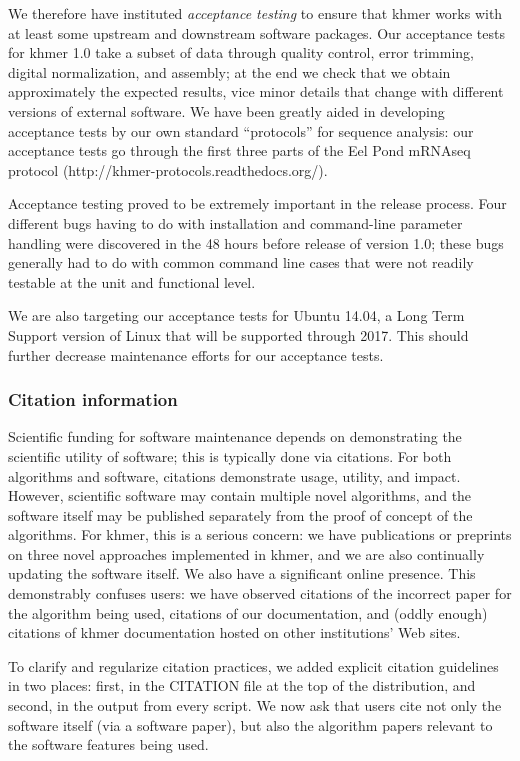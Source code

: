 \documentclass[12pt]{article}
\begin{document}
We therefore have instituted {\em acceptance testing} to ensure that
khmer works with at least some upstream and downstream software
packages.  Our acceptance tests for khmer 1.0 take a subset of data
through quality control, error trimming, digital normalization, and
assembly; at the end we check that we obtain approximately the
expected results, vice minor details that change with different
versions of external software.  We have been greatly aided in
developing acceptance tests by our own standard ``protocols'' for sequence
analysis: our acceptance tests go through the first three parts of the
Eel Pond mRNAseq protocol (http://khmer-protocols.readthedocs.org/).

Acceptance testing proved to be extremely important in the release
process.  Four different bugs having to do with installation and
command-line parameter handling were discovered in the 48 hours before
release of version 1.0; these bugs generally had to do with common command line
cases that were not readily testable at the unit and functional level.

We are also targeting our acceptance tests for Ubuntu 14.04, a Long
Term Support version of Linux that will be supported through 2017.
This should further decrease maintenance efforts for our acceptance
tests.

\subsubsection{Citation information}

Scientific funding for software maintenance depends on demonstrating
the scientific utility of software; this is typically done via
citations.  For both algorithms and software, citations demonstrate
usage, utility, and impact.  However, scientific software may contain
multiple novel algorithms, and the software itself may be published
separately from the proof of concept of the algorithms.  For khmer,
this is a serious concern: we have publications or preprints on three
novel approaches implemented in khmer, and we are also continually
updating the software itself.  We also have a significant online
presence. This demonstrably confuses users: we have observed citations
of the incorrect paper for the algorithm being used, citations of our
documentation, and (oddly enough) citations of khmer documentation
hosted on other institutions' Web sites.

To clarify and regularize citation practices, we added explicit
citation guidelines in two places: first, in the CITATION file at the
top of the distribution, and second, in the output from every script.
We now ask that users cite not only the software itself (via a
software paper), but also the algorithm papers relevant to the
software features being used.
\end{document}
